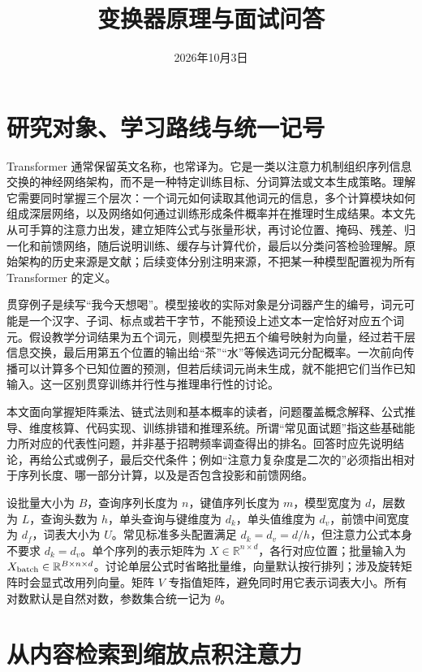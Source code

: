 \documentclass[UTF8,12pt,a4paper,fontset=fandol]{ctexart}
\title{变换器原理与面试问答}
\author{}
\date{2026年10月3日}
\begin{document}
\maketitle
\tableofcontents

\section{研究对象、学习路线与统一记号}
\label{sec:tr-intro}

Transformer 通常保留英文名称，也常译为。它是一类以注意力机制组织序列信息交换的神经网络架构，而不是一种特定训练目标、分词算法或文本生成策略。理解它需要同时掌握三个层次：一个词元如何读取其他词元的信息，多个计算模块如何组成深层网络，以及网络如何通过训练形成条件概率并在推理时生成结果。本文先从可手算的注意力出发，建立矩阵公式与张量形状，再讨论位置、掩码、残差、归一化和前馈网络，随后说明训练、缓存与计算代价，最后以分类问答检验理解。原始架构的历史来源是文献\cite{vaswani2017}；后续变体分别注明来源，不把某一种模型配置视为所有 Transformer 的定义。

贯穿例子是续写“我今天想喝”。模型接收的实际对象是分词器产生的编号，词元可能是一个汉字、子词、标点或若干字节，不能预设上述文本一定恰好对应五个词元。假设教学分词结果为五个词元，则模型先把五个编号映射为向量，经过若干层信息交换，最后用第五个位置的输出给“茶”“水”等候选词元分配概率。一次前向传播可以计算多个已知位置的预测，但若后续词元尚未生成，就不能把它们当作已知输入。这一区别贯穿训练并行性与推理串行性的讨论。

本文面向掌握矩阵乘法、链式法则和基本概率的读者，问题覆盖概念解释、公式推导、维度核算、代码实现、训练排错和推理系统。所谓“常见面试题”指这些基础能力所对应的代表性问题，并非基于招聘频率调查得出的排名。回答时应先说明结论，再给公式或例子，最后交代条件；例如“注意力复杂度是二次的”必须指出相对于序列长度、哪一部分计算，以及是否包含投影和前馈网络。

设批量大小为 $B$，查询序列长度为 $n$，键值序列长度为 $m$，模型宽度为 $d$，层数为 $L$，查询头数为 $h$，单头查询与键维度为 $d_k$，单头值维度为 $d_v$，前馈中间宽度为 $d_f$，词表大小为 $U$。常见标准多头配置满足 $d_k=d_v=d/h$，但注意力公式本身不要求 $d_k=d_v$。单个序列的表示矩阵为 $X\in\mathbb R^{n\times d}$，各行对应位置；批量输入为 $X_{\rm batch}\in\mathbb R^{B\times n\times d}$。讨论单层公式时省略批量维，向量默认按行排列；涉及旋转矩阵时会显式改用列向量。矩阵 $V$ 专指值矩阵，避免同时用它表示词表大小。所有对数默认是自然对数，参数集合统一记为 $\theta$。

\section{从内容检索到缩放点积注意力}
\label{sec:tr-attention}
\end{document}

